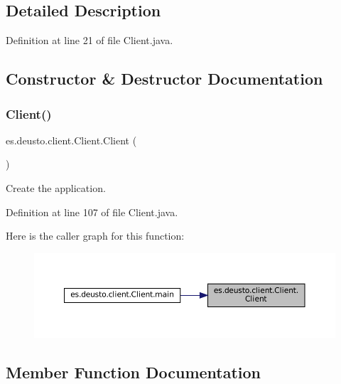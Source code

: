 \subsection{Detailed Description}


Definition at line 21 of file Client.\+java.



\subsection{Constructor \& Destructor Documentation}
\mbox{\label{classes_1_1deusto_1_1client_1_1_client_a71c03e318a72447da873297f3364f67f}} 
\subsubsection{\texorpdfstring{Client()}{Client()}}
{\footnotesize\ttfamily es.\+deusto.\+client.\+Client.\+Client (\begin{DoxyParamCaption}{ }\end{DoxyParamCaption})}

Create the application. 

Definition at line 107 of file Client.\+java.

Here is the caller graph for this function\+:
\nopagebreak
\begin{figure}[H]
\begin{center}
\leavevmode
\includegraphics[width=350pt]{classes_1_1deusto_1_1client_1_1_client_a71c03e318a72447da873297f3364f67f_icgraph}
\end{center}
\end{figure}


\subsection{Member Function Documentation}
\mbox{\label{classes_1_1deusto_1_1client_1_1_client_aaed61e092ef0cfa2b78065df6e6b0f55}} 
